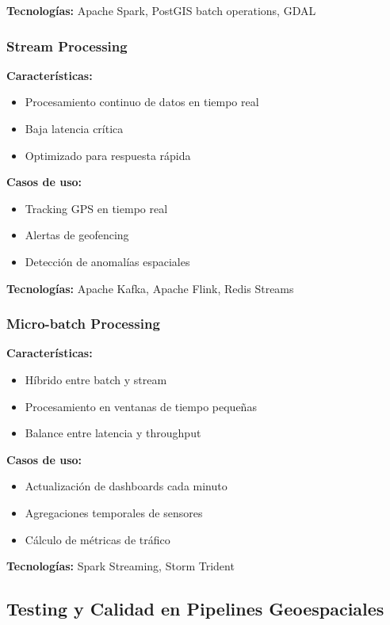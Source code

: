 \documentclass[11pt,a4paper]{article}
\begin{document}
\textbf{Tecnologías:} Apache Spark, PostGIS batch operations, GDAL

\subsubsection{Stream Processing}
\textbf{Características:}
\begin{itemize}
    \item Procesamiento continuo de datos en tiempo real
    \item Baja latencia crítica
    \item Optimizado para respuesta rápida
\end{itemize}

\textbf{Casos de uso:}
\begin{itemize}
    \item Tracking GPS en tiempo real
    \item Alertas de geofencing
    \item Detección de anomalías espaciales
\end{itemize}

\textbf{Tecnologías:} Apache Kafka, Apache Flink, Redis Streams

\subsubsection{Micro-batch Processing}
\textbf{Características:}
\begin{itemize}
    \item Híbrido entre batch y stream
    \item Procesamiento en ventanas de tiempo pequeñas
    \item Balance entre latencia y throughput
\end{itemize}

\textbf{Casos de uso:}
\begin{itemize}
    \item Actualización de dashboards cada minuto
    \item Agregaciones temporales de sensores
    \item Cálculo de métricas de tráfico
\end{itemize}

\textbf{Tecnologías:} Spark Streaming, Storm Trident

\subsection{Testing y Calidad en Pipelines Geoespaciales}
\end{document}
